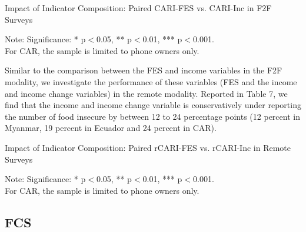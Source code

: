 \documentclass[11pt,harvard]{article}
\begin{document}
	\begin{table}[htbp]
		\centering
		\begin{adjustbox}{max width=\textwidth}
			\begin{threeparttable}
				\caption{Impact of Indicator Composition: Paired CARI-FES vs. CARI-Inc in F2F Surveys}
				\scriptsize
				 
				\label{tab:Paired_F2F_CARI_FES_INC_All_Country}
				\begin{tablenotes}
					\item Note: Significance: * p$<$0.05, ** p$<$0.01, *** p$<$0.001. \\
					For CAR, the sample is limited to phone owners only.
				\end{tablenotes}
			\end{threeparttable}
		\end{adjustbox}
	\end{table}
	
	Similar to the comparison between the FES and income variables in the F2F modality, we investigate the performance of these variables (FES and the income and income change variables) in the remote modality. Reported in Table 7, we find that the income and income change variable is conservatively under reporting the number of food insecure by between 12 to 24 percentage points (12 percent in Myanmar, 19 percent in Ecuador and 24 percent in CAR). 
	
	\begin{table}[htbp]
		\centering
		\begin{adjustbox}{max width=\textwidth}
			\begin{threeparttable}
				\caption{Impact of Indicator Composition: Paired rCARI-FES vs. rCARI-Inc in Remote Surveys}
				\scriptsize
				 
				\label{tab:Paired_RM_rCARI_FES_INC_All_Country}
				\begin{tablenotes}
					\item Note: Significance: * p$<$0.05, ** p$<$0.01, *** p$<$0.001. \\
					For CAR, the sample is limited to phone owners only.
				\end{tablenotes}
			\end{threeparttable}
		\end{adjustbox}
	\end{table}
	
	\clearpage
	
	\subsection{FCS}
	
\end{document}
